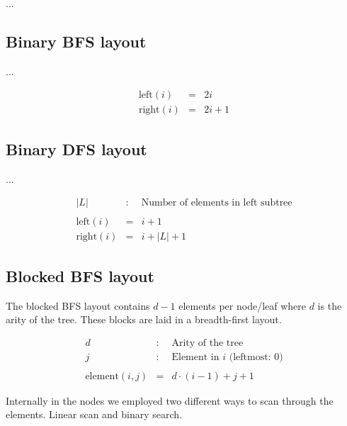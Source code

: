 \documentclass[a4paper]{article}
\begin{document}
...

\subsection{Binary BFS layout}

...

\begin{eqnarray*}
\mathrm{left}(i) & = & 2i \\
\mathrm{right}(i) & = & 2i + 1
\end{eqnarray*}


\subsection{Binary DFS layout}

...

\begin{eqnarray*}
|L| & : & \textrm{Number of elements in left subtree} \\
\\
\mathrm{left}(i) & = & i + 1 \\
\mathrm{right}(i) & = & i + |L| + 1
\end{eqnarray*}


\subsection{Blocked BFS layout}

The blocked BFS layout contains $d - 1$ elements per node/leaf where $d$ is the arity of the tree. These blocks are laid in a breadth-first layout.

\begin{eqnarray*}
d & : & \textrm{Arity of the tree} \\
j & : & \textrm{Element in $i$ (leftmost: $0$)} \\
\\
\mathrm{element}(i, j) & = & d\cdot (i - 1) + j + 1
\end{eqnarray*}


Internally in the nodes we employed two different ways to scan through the elements. Linear scan and binary search.

\end{document}
